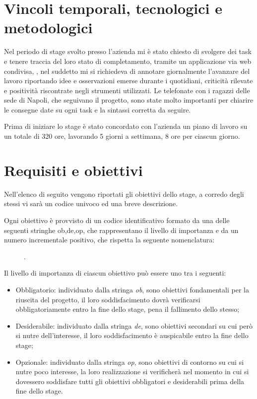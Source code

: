 \section{Vincoli temporali, tecnologici e metodologici}
Nel periodo di stage svolto presso l'azienda mi è stato chiesto di svolgere dei task e tenere traccia del loro stato di completamento, tramite un applicazione via web condivisa, , nel suddetto mi si richiedeva di annotare giornalmente l'avanzare del lavoro riportando idee e osservazioni emerse durante i  quotidiani, criticità rilevate e positività riscontrate negli strumenti utilizzati.
Le telefonate con i ragazzi delle sede di Napoli, che seguivano il progetto, sono state molto importanti per chiarire le consegne date su ogni task e la sintassi corretta da seguire.

Prima di iniziare lo stage è stato concordato con l'azienda un piano di lavoro su un totale di 320 ore, lavorando 5 giorni a settimana, 8 ore per ciascun giorno. 

\section{Requisiti e obiettivi}
Nell'elenco di seguito vengono riportati gli obiettivi dello stage, a corredo degli stessi vi sarà un codice univoco ed una breve descrizione.

Ogni obiettivo è provvisto di un codice identificativo formato da una delle seguenti stringhe ob,de,op, che rappresentano il livello di importanza e da un numero incrementale positivo, che rispetta la seguente nomenclatura: 
\begin{figure}[htp]
	\centering
	[importanza][identificativo].
\end{figure}

Il livello di importanza di ciascun obiettivo può essere uno tra i seguenti:
\begin{itemize}
	\item Obbligatorio: individuato dalla stringa \textit{ob}, sono obiettivi fondamentali per la riuscita del progetto, il loro soddisfacimento dovrà verificarsi obbligatoriamente entro la fine dello stage, pena il fallimento dello stesso;
	\item Desiderabile: individuato dalla stringa \textit{de}, sono obiettivi secondari su cui però si nutre dell'interesse, il loro soddisfacimento è auspicabile entro la fine dello stage;
	\item Opzionale: individuato dalla stringa \textit{op}, sono obiettivi di contorno su cui si nutre poco interesse, la loro realizzazione si verificherà nel momento in cui si dovessero soddisfare tutti gli obiettivi obbligatori e desiderabili prima della fine dello stage.
\end{itemize}


